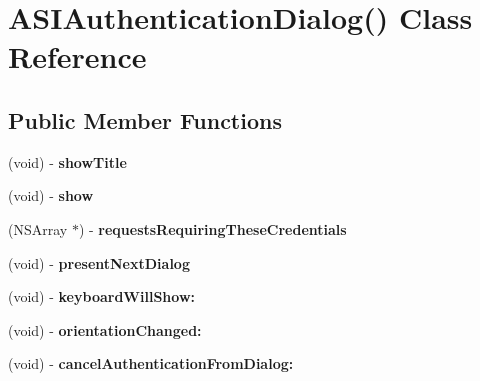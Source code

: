 \hypertarget{interface_a_s_i_authentication_dialog_07_08}{
\section{\-A\-S\-I\-Authentication\-Dialog() \-Class \-Reference}
\label{interface_a_s_i_authentication_dialog_07_08}
}
\subsection*{\-Public \-Member \-Functions}
\begin{DoxyCompactItemize}
\item 
\hypertarget{interface_a_s_i_authentication_dialog_07_08_a1e1b8fb41a061647bc8ecbee4cca8cdb}{
(void) -\/ {\bfseries show\-Title}}
\label{interface_a_s_i_authentication_dialog_07_08_a1e1b8fb41a061647bc8ecbee4cca8cdb}

\item 
\hypertarget{interface_a_s_i_authentication_dialog_07_08_ac12b99fc65aed45271e0522e491112b5}{
(void) -\/ {\bfseries show}}
\label{interface_a_s_i_authentication_dialog_07_08_ac12b99fc65aed45271e0522e491112b5}

\item 
\hypertarget{interface_a_s_i_authentication_dialog_07_08_a9e99d2195a52b4f6d17d9dc492d6bb71}{
(\-N\-S\-Array $\ast$) -\/ {\bfseries requests\-Requiring\-These\-Credentials}}
\label{interface_a_s_i_authentication_dialog_07_08_a9e99d2195a52b4f6d17d9dc492d6bb71}

\item 
\hypertarget{interface_a_s_i_authentication_dialog_07_08_ada0bb81ed8c9e7f290e74d2ac1a35817}{
(void) -\/ {\bfseries present\-Next\-Dialog}}
\label{interface_a_s_i_authentication_dialog_07_08_ada0bb81ed8c9e7f290e74d2ac1a35817}

\item 
\hypertarget{interface_a_s_i_authentication_dialog_07_08_a35b2d5a22b761083b971639d7896817d}{
(void) -\/ {\bfseries keyboard\-Will\-Show\-:}}
\label{interface_a_s_i_authentication_dialog_07_08_a35b2d5a22b761083b971639d7896817d}

\item 
\hypertarget{interface_a_s_i_authentication_dialog_07_08_af4983b6569ef4198bbbbb53e3ea70bf0}{
(void) -\/ {\bfseries orientation\-Changed\-:}}
\label{interface_a_s_i_authentication_dialog_07_08_af4983b6569ef4198bbbbb53e3ea70bf0}

\item 
\hypertarget{interface_a_s_i_authentication_dialog_07_08_adf15cb2756f70b5b5ac04b089230b00b}{
(void) -\/ {\bfseries cancel\-Authentication\-From\-Dialog\-:}}
\label{interface_a_s_i_authentication_dialog_07_08_adf15cb2756f70b5b5ac04b089230b00b}


\end{DoxyCompactItemize}
